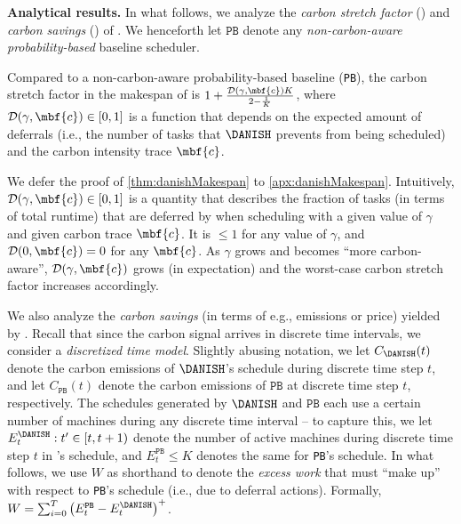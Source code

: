 \smallskip
\noindent\textbf{Analytical results. }
In what follows, we analyze the \textit{carbon stretch factor} () and \textit{carbon savings} () of \DANISH.
We henceforth let $\texttt{PB}$ denote any \textit{non-carbon-aware probability-based} baseline scheduler.

\begin{thm}\label{thm:danishMakespan}
    Compared to a non-carbon-aware probability-based baseline (\texttt{PB}), the carbon stretch factor in the makespan of \DANISH is $1 + \frac{\mathcal{D}(\gamma, \mbf{c}) K}{2 - \frac{1}{K}}$, where $\mathcal{D}(\gamma, \mbf{c}) \in [0,1]$ is a function that depends on the expected amount of deferrals (i.e., the number of tasks that $\DANISH$ prevents from being scheduled) and the carbon intensity trace $\mbf{c}$.
\end{thm}

We defer the proof of \autoref{thm:danishMakespan} to \autoref{apx:danishMakespan}.
Intuitively, $\mathcal{D}(\gamma, \mbf{c}) \in [0,1]$ is a quantity that describes the fraction of tasks (in terms of total runtime) that are deferred by \DANISH when scheduling with a given value of $\gamma$ and given carbon trace $\mbf{c}$.  It is $\leq 1$ for any value of $\gamma$, and $\mathcal{D}(0, \mbf{c}) = 0$ for any $\mbf{c}$.  As $\gamma$ grows and \DANISH becomes ``more carbon-aware'',  $\mathcal{D}(\gamma, \mbf{c})$ grows (in expectation) and the worst-case carbon stretch factor increases accordingly.



We also analyze the \textit{carbon savings} (in terms of e.g., emissions or price) yielded by \DANISH.  Recall that since the carbon signal arrives in discrete time intervals, we consider a \textit{discretized time model}.
Slightly abusing notation, we let $C_{\DANISH}(t)$ denote the carbon emissions of $\DANISH$'s schedule during discrete time step $t$, and let $C_{\texttt{PB}}(t)$ denote the carbon emissions of $\texttt{PB}$ at discrete time step $t$, respectively.  
The schedules generated by $\DANISH$ and $\texttt{PB}$ each use a certain number of machines during any discrete time interval -- to capture this, we let $E^\DANISH_t : t' \in [t, t+1)$ denote the number of active machines during discrete time step $t$ in \DANISH's schedule, and $E^\texttt{PB}_t \leq K$ denotes the same for \texttt{PB}'s schedule.  In what follows, we use $W$ as shorthand to denote the \textit{excess work} that \DANISH must ``make up'' with respect to \texttt{PB}'s schedule (i.e., due to deferral actions). Formally, $W = \sum_{i=0}^T \left( E^\texttt{PB}_t - E^\DANISH_t \right)^+$.


